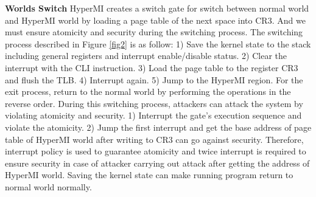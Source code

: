 \documentclass[conference]{IEEEtran}
\begin{document}
\textbf{Worlds Switch}
HyperMI creates a switch gate for switch between normal world and HyperMI world by loading a page table of the next space into CR3. And we must ensure atomicity and security during the switching process.
The switching process described in Figure \ref{fig2} is as follow: 1) Save the kernel state to the stack including general registers and interrupt enable/disable status. 2) Clear the interrupt with the CLI instruction. 3) Load the page table to the register CR3 and flush the TLB. 4) Interrupt again. 5) Jump to the HyperMI region. For the exit process, return to the normal world by performing the operations in the reverse order.
During this switching process, attackers can attack the system by violating atomicity and security. 1) Interrupt the gate's execution sequence and violate the atomicity. 2) Jump the first interrupt and get the base address of page table of HyperMI world after writing to CR3 can go against security. Therefore, interrupt policy is used to guarantee atomicity and twice interrupt is required to ensure security in case of attacker carrying out attack after getting the address of HyperMI world. Saving the kernel state can make running program return to normal world normally. 
\end{document}
